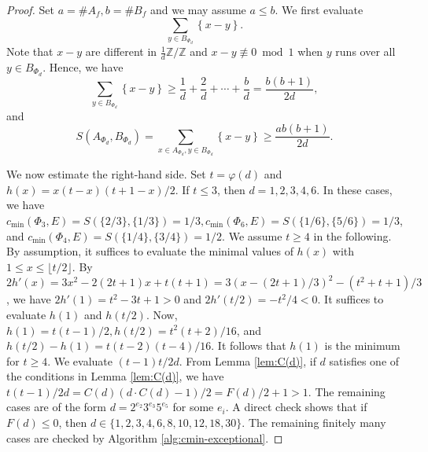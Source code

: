 \documentclass[11pt]{amsart}
\theoremstyle{plain}
\theoremstyle{definition}
\numberwithin{equation}{section}
\newcommand{\bbZ}{\mathbb{Z}}
\begin{document}
\begin{proof}
  Set $a = \#A_f, b = \#B_f$ and we may assume $a \leq b$.
  We first evaluate
  \[
    \sum_{y \in B_{\Phi_d}} \left\{ x-y\right\}.
  \]
  Note that $x-y$ are different in $\frac{1}{d}\bbZ/\bbZ$ and $x-y \not \equiv 0 \bmod 1$ when $y$ runs over all $y \in B_{\Phi_d}$.
  Hence, we have
  \[
    \sum_{y \in B_{\Phi_d}} \left\{ x-y\right\} \geq \frac{1}{d} + \frac{2}{d} + \cdots + \frac{b}{d} = \frac{b(b+1)}{2d},
  \]
  and
  \[
    S(A_{\Phi_d},B_{\Phi_d}) = \sum_{x \in A_{\Phi_d}, y \in B_{\Phi_d}} \left\{x-y\right\} \geq \frac{ab(b+1)}{2d}.
  \]

  We now estimate the right-hand side.
  Set $t = \varphi(d)$ and $h(x) = x(t-x)(t+1-x)/2$.
  If $t \leq 3$, then $d = 1,2,3,4,6$.
  In these cases, we have $c_{\min}(\Phi_3,E) = S(\{2/3\}, \{1/3\}) = 1/3,c_{\min}(\Phi_6,E) = S(\{1/6\}, \{5/6\}) = 1/3$, and  $c_{\min}(\Phi_4,E) = S(\{1/4\}, \{3/4\}) = 1/2$.
 We assume $t\geq 4$ in the following.
  By assumption, it suffices to evaluate the minimal values of $h(x)$ with $1 \leq x \leq \lfloor t/2\rfloor$.
  By
    $2h'(x) = 3x^2 -2(2t+1)x + t(t+1) = 3(x-(2t+1)/3)^2-(t^2+t+1)/3$,
  we have $2h'(1) = t^2-3t+1 > 0$ and $2h'(t/2) = -t^2/4<0$.
  It suffices to evaluate $h(1)$ and $h(t/2)$.
  Now, $h(1) = t(t-1)/2, h(t/2) = t^2(t+2)/16$, and
    $h(t/2) - h(1) = t(t-2)(t-4)/16$.
  It follows that $h(1)$ is the minimum for $t\geq 4$.
  We evaluate $(t-1)t/2d$.
  From Lemma \ref{lem:C(d)}, if $d$ satisfies one of the conditions in Lemma \ref{lem:C(d)}, we have
  $t(t-1)/2d = C(d)(d \cdot C(d) -1)/2 = F(d)/2 + 1 > 1$.
  The remaining cases are of the form $d = 2^{e_2} 3^{e_3}5^{e_5}$ for some $e_i$.
  A direct check shows that if
  $F(d) \leq 0$,
  then $d \in \{1,2,3,4,6,8,10,12,18,30\}$.
  The remaining finitely many cases are checked by Algorithm \ref{alg:cmin-exceptional}.
\end{proof}
\end{document}
